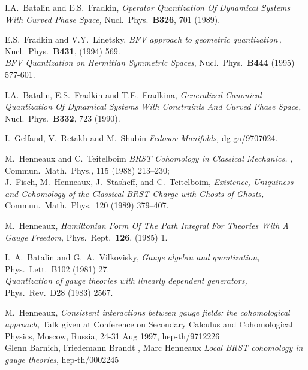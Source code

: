 \documentclass[a4paper,11pt,oneside]{amsart}
\theoremstyle{plain}
\numberwithin{equation}{section} %
\numberwithin{figure}{section} %
\def\PRD{Phys.\ Rev.\ D}
\def\PLB{Phys.\ Lett.\ B}
\begin{document}
\begin{thebibliography}{33}
\bibitem{[BF89]} I.A.~Batalin and E.S.~Fradkin,
{\em Operator Quantization Of Dynamical Systems
With Curved Phase Space,} Nucl.\ Phys.\ {\bf B326},
701 (1989).



\bibitem{[FL]}
E.S.~Fradkin and V.Y.~Linetsky,
{\em BFV approach to geometric quantization\,,}
Nucl.\ Phys.\ {\bf B431}, (1994) 569.\\
{\em BFV Quantization on Hermitian Symmetric Spaces},
Nucl.\ Phys.\ {\bf B444} (1995) 577-601.

\bibitem{[BFF]}
I.A.~Batalin, E.S.~Fradkin and T.E.~Fradkina,
{\em Generalized Canonical Quantization Of Dynamical Systems With
  Constraints And Curved Phase Space,}
Nucl.\ Phys.\ {\bf B332}, 723 (1990).

\bibitem{[GRS]} I.~Gelfand, V.~Retakh and M.~Shubin
{\em Fedosov Manifolds,} dg-ga/9707024.

\bibitem{[HTS]} M.~Henneaux and C.~Teitelboim
{\em BRST Cohomology in Classical Mechanics.}
, Commun.\ Math.\ Phys., 115
(1988) 213--230;\\
 J.~Fisch, M.~Henneaux, J.~Stasheff, and C.~Teitelboim,
{\em Existence, Uniquiness and Cohomology of the Classical BRST Charge with
Ghosts of Ghosts,} Commun.\ Math.\ Phys.\ 120 (1989) 379--407.

\bibitem{[H-omega]} M.~Henneaux,
{\em Hamiltonian Form Of The Path Integral For Theories With A Gauge Freedom,}
Phys.\ Rept.\  {\bf 126}, (1985) 1.

\bibitem{[BV]} I.~A.~Batalin and G.~A.~Vilkovisky,
{\em Gauge algebra and quantization,} \PLB{102} (1981) 27.\\
{\em Quantization of gauge theories with linearly dependent generators,}
\PRD{28} (1983) 2567.

 M.~Henneaux, {\em Consistent interactions between
gauge fields: the cohomological approach,} Talk given at Conference on
Secondary Calculus and Cohomological Physics, Moscow, Russia, 24-31 Aug 1997,
hep-th/9712226 \\
Glenn Barnich, Friedemann Brandt ,
Marc Henneaux
{\em Local BRST cohomology in gauge theories}, hep-th/0002245
\end{thebibliography}
\end{document}
